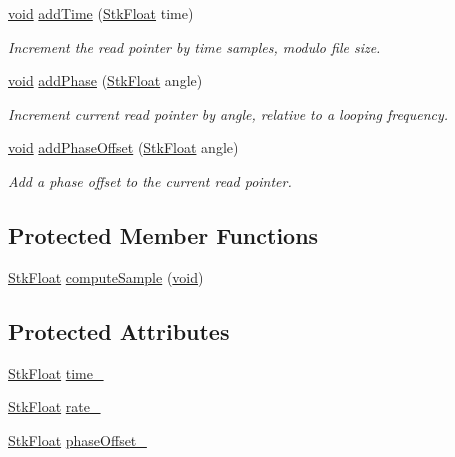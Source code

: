 \begin{DoxyCompactItemize}
\hyperlink{sound_8c_ae35f5844602719cf66324f4de2a658b3}{void} \hyperlink{class_nyq_1_1_sine_wave_a8951518618c2b63e693c640cb326b03d}{add\+Time} (\hyperlink{namespace_nyq_a044fa20a706520a617bbbf458a7db7e4}{Stk\+Float} time)
\begin{DoxyCompactList}\small\item\em Increment the read pointer by {\itshape time} samples, modulo file size. \end{DoxyCompactList}\item 
\hyperlink{sound_8c_ae35f5844602719cf66324f4de2a658b3}{void} \hyperlink{class_nyq_1_1_sine_wave_a0be958041f09be5f77ebc56170e49589}{add\+Phase} (\hyperlink{namespace_nyq_a044fa20a706520a617bbbf458a7db7e4}{Stk\+Float} angle)
\begin{DoxyCompactList}\small\item\em Increment current read pointer by {\itshape angle}, relative to a looping frequency. \end{DoxyCompactList}\item 
\hyperlink{sound_8c_ae35f5844602719cf66324f4de2a658b3}{void} \hyperlink{class_nyq_1_1_sine_wave_aa84bbd94d772e19f3f6712656ffbbf5e}{add\+Phase\+Offset} (\hyperlink{namespace_nyq_a044fa20a706520a617bbbf458a7db7e4}{Stk\+Float} angle)
\begin{DoxyCompactList}\small\item\em Add a phase offset to the current read pointer. \end{DoxyCompactList}\end{DoxyCompactItemize}
\subsection*{Protected Member Functions}
\begin{DoxyCompactItemize}
\item 
\hyperlink{namespace_nyq_a044fa20a706520a617bbbf458a7db7e4}{Stk\+Float} \hyperlink{class_nyq_1_1_sine_wave_a1bd95a3945731de65133178a654adbaf}{compute\+Sample} (\hyperlink{sound_8c_ae35f5844602719cf66324f4de2a658b3}{void})
\end{DoxyCompactItemize}
\subsection*{Protected Attributes}
\begin{DoxyCompactItemize}
\item 
\hyperlink{namespace_nyq_a044fa20a706520a617bbbf458a7db7e4}{Stk\+Float} \hyperlink{class_nyq_1_1_sine_wave_a43486be00e4b7cb653b37c2611a8dd46}{time\+\_\+}
\item 
\hyperlink{namespace_nyq_a044fa20a706520a617bbbf458a7db7e4}{Stk\+Float} \hyperlink{class_nyq_1_1_sine_wave_a1960362ba9adb9e9116bada43344476e}{rate\+\_\+}
\item 
\hyperlink{namespace_nyq_a044fa20a706520a617bbbf458a7db7e4}{Stk\+Float} \hyperlink{class_nyq_1_1_sine_wave_a66feda88f9324f731c19fb3ebb2c152c}{phase\+Offset\+\_\+}
\end{DoxyCompactItemize}
